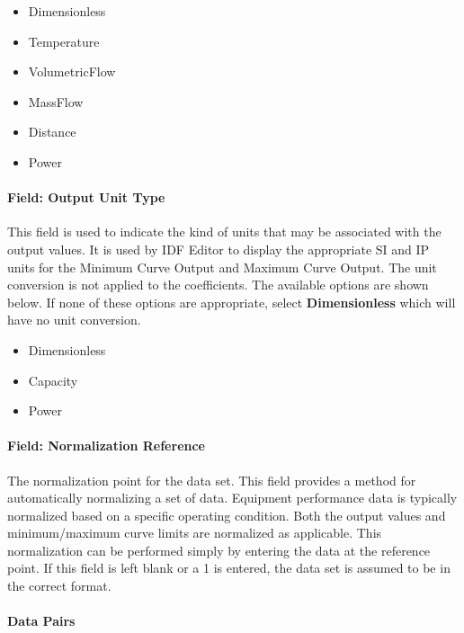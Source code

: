 \begin{itemize}
\item
  Dimensionless
\item
  Temperature
\item
  VolumetricFlow
\item
  MassFlow
\item
  Distance
\item
  Power
\end{itemize}

\paragraph{Field: Output Unit Type}\label{field-output-unit-type-1-000}

This field is used to indicate the kind of units that may be associated with the output values. It is used by IDF Editor to display the appropriate SI and IP units for the Minimum Curve Output and Maximum Curve Output. The unit conversion is not applied to the coefficients. The available options are shown below. If none of these options are appropriate, select \textbf{Dimensionless} which will have no unit conversion.

\begin{itemize}
\item
  Dimensionless
\item
  Capacity
\item
  Power
\end{itemize}

\paragraph{Field: Normalization Reference}\label{field-normalization-reference-1}

The normalization point for the data set. This field provides a method for automatically normalizing a set of data. Equipment performance data is typically normalized based on a specific operating condition. Both the output values and minimum/maximum curve limits are normalized as applicable. This normalization can be performed simply by entering the data at the reference point. If this field is left blank or a 1 is entered, the data set is assumed to be in the correct format.

\paragraph{Data Pairs}\label{data-pairs-1}

